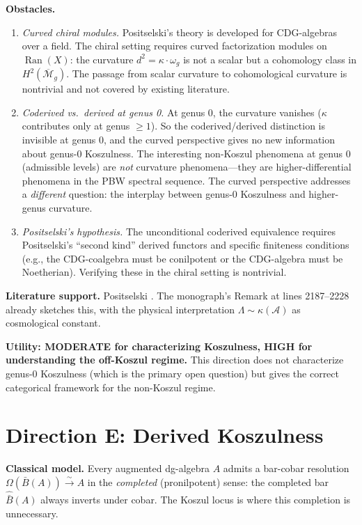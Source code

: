 \documentclass[11pt]{article}
\theoremstyle{remark}
\newcommand{\cA}{\mathcal{A}}
\newcommand{\barB}{\bar{B}}
\newcommand{\Ran}{\operatorname{Ran}}
\begin{document}
\textbf{Obstacles.}
\begin{enumerate}[label=(D\arabic*)]
\item \emph{Curved chiral modules.}  Positselski's theory is developed for CDG-algebras over a field.  The chiral setting requires curved factorization modules on $\Ran(X)$: the curvature $d^2 = \kappa \cdot \omega_g$ is not a scalar but a cohomology class in $H^2(\overline{\mathcal{M}}_g)$.  The passage from scalar curvature to cohomological curvature is nontrivial and not covered by existing literature.

\item \emph{Coderived vs.\ derived at genus 0.}  At genus 0, the curvature vanishes ($\kappa$ contributes only at genus $\geq 1$).  So the coderived/derived distinction is invisible at genus 0, and the curved perspective gives no new information about genus-0 Koszulness.  The interesting non-Koszul phenomena at genus 0 (admissible levels) are \emph{not} curvature phenomena---they are higher-differential phenomena in the PBW spectral sequence.  The curved perspective addresses a \emph{different} question: the interplay between genus-0 Koszulness and higher-genus curvature.

\item \emph{Positselski's hypothesis.}  The unconditional coderived equivalence requires Positselski's ``second kind'' derived functors and specific finiteness conditions (e.g., the CDG-coalgebra must be conilpotent or the CDG-algebra must be Noetherian).  Verifying these in the chiral setting is nontrivial.
\end{enumerate}

\textbf{Literature support.}  Positselski \cite{Positselski11, Positselski18}.  The monograph's Remark at lines 2187--2228 already sketches this, with the physical interpretation $\Lambda \sim \kappa(\cA)$ as cosmological constant.

\textbf{Utility: MODERATE for characterizing Koszulness, HIGH for understanding the off-Koszul regime.}  This direction does not characterize genus-0 Koszulness (which is the primary open question) but gives the correct categorical framework for the non-Koszul regime.

\section{Direction E: Derived Koszulness}

\textbf{Classical model.}  Every augmented dg-algebra $A$ admits a bar-cobar resolution $\Omega(\barB(A)) \xrightarrow{\sim} A$ in the \emph{completed} (pronilpotent) sense: the completed bar $\widehat{\barB}(A)$ always inverts under cobar.  The Koszul locus is where this completion is unnecessary.
\end{document}

